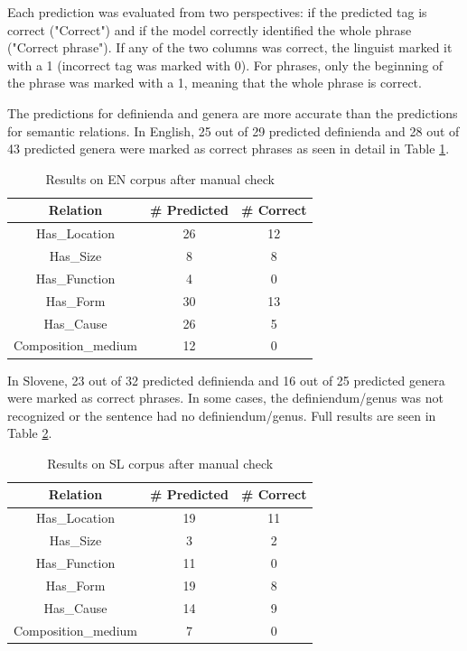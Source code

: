 \documentclass[fleqn,moreauthors,10pt]{ds_report}
\begin{document}
Each prediction was evaluated from two perspectives: if the predicted tag is correct ("Correct") and if the model correctly identified the whole phrase ("Correct phrase"). If any of the two columns was correct, the linguist marked it with a 1 (incorrect tag was marked with 0). For phrases, only the beginning of the phrase was marked with a 1, meaning that the whole phrase is correct.

The predictions for definienda and genera are more accurate than the predictions for semantic relations. In English, 25 out of 29 predicted definienda and 28 out of 43 predicted genera were marked as correct phrases as seen in detail in Table \ref{tab:linguist_en}. 

\begin{table}[!h]
    \centering
    \begin{tabular}{|c|c|c|} \hline
        \textbf{Relation} & \textbf{\# Predicted} & \textbf{\# Correct}\\ \hline
        Has\_Location &26 &12  \\ \hline
        Has\_Size & 8& 8 \\ \hline
        Has\_Function & 4& 0 \\ \hline
        Has\_Form & 30& 13 \\ \hline
        Has\_Cause & 26& 5 \\ \hline
        Composition\_medium & 12& 0 \\ \hline
    \end{tabular}
    \caption{Results on EN corpus after manual check}
    \label{tab:linguist_en}
\end{table}

In Slovene, 23 out of 32 predicted definienda and 16 out of 25 predicted genera were marked as correct phrases. In some cases, the definiendum/genus was not recognized or the sentence had no definiendum/genus. Full results are seen in Table \ref{tab:linguist_sl}.

\begin{table}[!h]
    \centering
    \begin{tabular}{|c|c|c|} \hline
        \textbf{Relation} & \textbf{\# Predicted} & \textbf{\# Correct}\\ \hline
        Has\_Location &19 &11  \\ \hline
        Has\_Size & 3& 2 \\ \hline
        Has\_Function & 11& 0 \\ \hline
        Has\_Form & 19& 8 \\ \hline
        Has\_Cause & 14& 9 \\ \hline
        Composition\_medium & 7& 0 \\ \hline
    \end{tabular}
    \caption{Results on SL corpus after manual check}
    \label{tab:linguist_sl}
\end{table}
\end{document}
